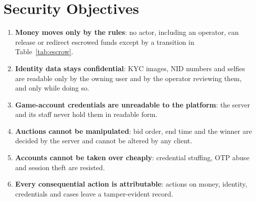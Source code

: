 \documentclass[11pt,a4paper]{report}
\begin{document}
\section{Security Objectives}
\begin{enumerate}[label=\textbf{SO-\arabic*}, nosep, leftmargin=*]
    \item \textbf{Money moves only by the rules}: no actor, including an operator, can release or redirect escrowed funds except by a transition in Table~\ref{tab:escrow}.
    \item \textbf{Identity data stays confidential}: KYC images, NID numbers and selfies are readable only by the owning user and by the operator reviewing them, and only while doing so.
    \item \textbf{Game-account credentials are unreadable to the platform}: the server and its staff never hold them in readable form.
    \item \textbf{Auctions cannot be manipulated}: bid order, end time and the winner are decided by the server and cannot be altered by any client.
    \item \textbf{Accounts cannot be taken over cheaply}: credential stuffing, OTP abuse and session theft are resisted.
    \item \textbf{Every consequential action is attributable}: actions on money, identity, credentials and cases leave a tamper-evident record.
\end{enumerate}
\end{document}
